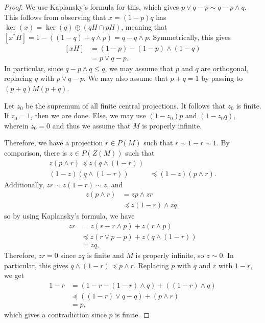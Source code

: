 \documentclass[10pt]{mypackage}
\begin{document}
\begin{proof}
  We use Kaplansky's formula for this, which gives $p\vee q - p \sim q-p\wedge q$. This follows from observing that $x = \left( 1-p \right)q$ has $\ker\left( x \right) = \ker\left( q \right)\oplus \left( qH \cap pH \right)$, meaning that $\left[ x^{\ast}H \right] = 1 - \left( \left( 1 - q \right) + q\wedge p \right) = q-q\wedge p$. Symmetrically, this gives
  \begin{align*}
    \left[ xH \right] &= \left( 1-p \right)-\left( 1-p \right)\wedge \left( 1-q \right)\\
                      &= p\vee q - p.
  \end{align*}
  In particular, since $q-p\wedge q \leq q$, we may assume that $p$ and $q$ are orthogonal, replacing $q$ with $p\vee q - p$. We may also assume that $p + q = 1$ by passing to $\left( p+q \right)M\left( p+q \right)$.

  Let $z_0$ be the supremum of all finite central projections. It follows that $z_0$ is finite. If $z_0 = 1$, then we are done. Else, we may use $\left( 1-z_0 \right)p$ and $\left( 1-z_0 q \right)$, wherein $z_0 = 0$ and thus we assume that $M$ is properly infinite.

  Therefore, we have a projection $r\in P(M)$ such that $r\sim 1-r \sim 1$. By comparison, there is $z\in P(Z(M))$ such that
  \begin{align*}
    z\left( p\wedge r \right) \preceq z\left( q\wedge \left( 1-r \right) \right)\\
    \left( 1-z \right)\left( q\wedge \left( 1-r \right) \right) &\preceq \left( 1-z \right)\left( p\wedge r \right).
  \end{align*}
  Additionally, $zr \sim z\left( 1-r \right)\sim z$, and
  \begin{align*}
    z\left( p\wedge r \right) &= zp\wedge zr\\
                              &\preceq z\left( 1-r \right)\wedge zq,
  \end{align*}
  so by using Kaplansky's formula, we have
  \begin{align*}
    zr &= z\left( r-r\wedge p \right) + z\left( r\wedge p \right)\\
       &\preceq z\left( r\vee p - p \right) + z\left( q\wedge \left( 1-r \right) \right)\\
       &= zq,
  \end{align*}
  Therefore, $zr = 0$ since $zq$ is finite and $M$ is properly infinite, so $z \sim 0$. In particular, this gives $q\wedge \left( 1-r \right) \preceq p\wedge r$. Replacing $p$ with $q$ and $r$ with $1-r$, we get
  \begin{align*}
    1-r &= \left( 1-r-\left( 1-r \right)\wedge q \right) + \left( \left( 1-r \right)\wedge q \right)\\
        &\preceq \left( \left( 1-r \right)\vee q - q \right) + \left( p\wedge r \right)\\
        &= p,
  \end{align*}
  which gives a contradiction since $p$ is finite.
\end{proof}
\end{document}
